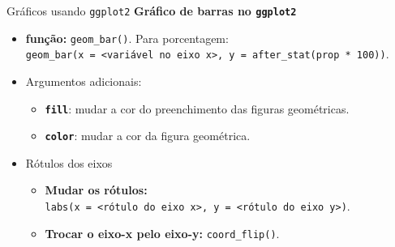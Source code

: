 \documentclass[
  10pt,
  ignorenonframetext,
]{beamer}
\providecommand{\tightlist}{%
  \setlength{\itemsep}{0pt}\setlength{\parskip}{0pt}}\usepackage{longtable,booktabs,array}
\begin{document}
\begin{frame}[fragile]{Gráficos usando \texttt{ggplot2}}
\protect\hypertarget{gruxe1ficos-usando-ggplot2-2}{}
\textbf{Gráfico de barras no \texttt{ggplot2}}

\begin{itemize}
\tightlist
\item
  \textbf{função:} \texttt{geom\_bar()}. Para porcentagem:
  \texttt{geom\_bar(x\ =\ \textless{}variável\ no\ eixo\ x\textgreater{},\ y\ =\ after\_stat(prop\ *\ 100))}.
\item
  Argumentos adicionais:

  \begin{itemize}
  \tightlist
  \item
    \textbf{\texttt{fill}}: mudar a cor do preenchimento das figuras
    geométricas.
  \item
    \textbf{\texttt{color}}: mudar a cor da figura geométrica.
  \end{itemize}
\item
  Rótulos dos eixos

  \begin{itemize}
  \tightlist
  \item
    \textbf{Mudar os rótulos:}
    \texttt{labs(x\ =\ \textless{}rótulo\ do\ eixo\ x\textgreater{},\ y\ =\ \textless{}rótulo\ do\ eixo\ y\textgreater{})}.
  \item
    \textbf{Trocar o eixo-x pelo eixo-y:} \texttt{coord\_flip()}.
  \end{itemize}
\end{itemize}
\end{frame}
\end{document}

